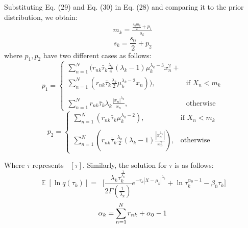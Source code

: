 \documentclass[conference]{IEEEtran}
\begin{document}
    Substituting Eq. (29) and Eq. (30) in Eq. (28) and comparing it to the prior distribution, we obtain:
    \begin{equation}
        \begin{split}\label{mk}
            m_k = \frac{\frac{s_0m_0}{2} + p_1}
            {s_k}
        \end{split}
    \end{equation}
    \begin{equation}\label{sk}
        s_k = \frac{s_0}{2} + p_2
    \end{equation}
where $p_1, p_2 $ have two different cases as follows:
\[
    p_1= 
\begin{cases}
    \sum_{{n=1}}^{N}(r_{nk}\bar{\tau}_k\frac{\lambda_k}{4}(\lambda_k-1)\mu_k^{\lambda_k-3} x_n^2 + \\ 
        \sum_{{n=1}}^{N}(r_{nk}\bar{\tau}_k\frac{\lambda_k}{2}\mu_k^{\lambda_k-2}x_n))     ,& \text{if } X_n < m_k\\ \\
        \sum_{n=1}^{N}r_{nk}\bar{\tau}_k\lambda_k\frac{|x_n|^{\lambda_k}}{x_n},              & \text{otherwise}
\end{cases}
\]
\[
        p_2= 
    \begin{cases}
        \sum_{{n=1}}^{N}(r_{nk}\bar{\tau}_k\mu_k^{\lambda_k-2}),& \text{if } X_n < m_k\\ \\
        \sum_{{n=1}}^{N}(r_{nk}\bar{\tau}_k\frac{\lambda_k}{2}(\lambda_k-1)\frac{|x_n^{\lambda_k}|}{x_n^2}),              & \text{otherwise}
    \end{cases}
    \]


Where $\bar{\tau}$ represents $\mathop{\mathbb{E}_\tau}[\tau]$.
Similarly, the solution for $\tau$ is as follows:
    \begin{equation}
        \mathop{\mathbb{E}}[\ln q(\tau_k)] = \mathop{\mathbb{E}_\mu}\bigg[\frac{\lambda_k \tau_k^{\frac{1}{\lambda_k}}}{2\Gamma(\frac{1}{\lambda_k})} e ^ {-\tau_k |X-\mu_k|^{\lambda_k}} + \ln\tau_k^{\alpha_0 - 1} - \beta_0 \tau_k\bigg]
    \end{equation}
    \begin{equation}
        \begin{split}\label{alphak}
            \alpha_k = \sum_{\mathclap{n=1}}^{N} r_{nk} + \alpha_0 - 1
        \end{split}
    \end{equation}
    
\end{document}
